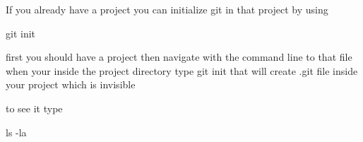 If you already have a project you can initialize git in that project by using

  git init

first you should have a project 
then navigate with the command line to that file 
when your inside the project directory 
type   git init 
that will create  .git   file inside your project which is invisible 

to see it type 

ls -la  